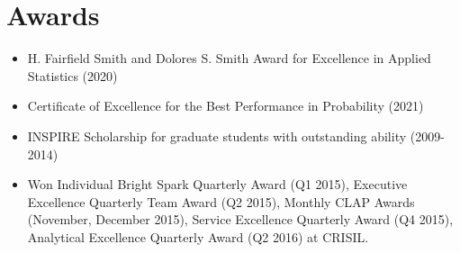 \documentclass[letterpaper,11pt]{article}
\begin{document}
\section*{Awards}

\begin{itemize}
    \item H. Fairfield Smith and Dolores S. Smith Award for
    Excellence in Applied Statistics (2020)  
    \item Certificate of Excellence for the Best Performance in
    Probability (2021)
    \item INSPIRE Scholarship for graduate students with outstanding
    ability (2009-2014)
    \item Won Individual Bright Spark Quarterly Award (Q1 2015),
    Executive Excellence Quarterly Team Award (Q2 2015), Monthly CLAP
    Awards (November, December 2015), Service Excellence Quarterly
    Award (Q4 2015), Analytical Excellence Quarterly Award (Q2 2016)
    at CRISIL.
\end{itemize}  
\end{document}
